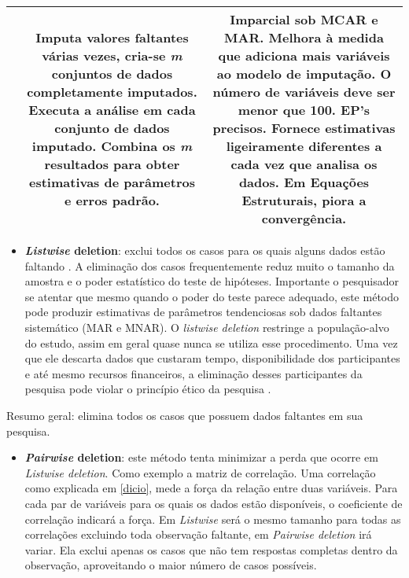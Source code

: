 \documentclass[
]{book}
\providecommand{\tightlist}{%
  \setlength{\itemsep}{0pt}\setlength{\parskip}{0pt}}
\begin{document}
\begin{longtable}[]{@{}ccc@{}}
\begin{minipage}[t]{0.30\columnwidth}
\end{minipage} & \begin{minipage}[t]{0.30\columnwidth}\centering
Imputa valores faltantes várias vezes, cria-se \emph{m} conjuntos de dados completamente imputados. Executa a análise em cada conjunto de dados imputado. Combina os \emph{m} resultados para obter estimativas de parâmetros e erros padrão.\strut
\end{minipage} & \begin{minipage}[t]{0.30\columnwidth}\centering
Imparcial sob MCAR e MAR. Melhora à medida que adiciona mais variáveis ao modelo de imputação. O número de variáveis deve ser menor que 100. EP's precisos. Fornece estimativas ligeiramente diferentes a cada vez que analisa os dados. Em Equações Estruturais, piora a convergência.\strut
\end{minipage}\tabularnewline
\bottomrule
\end{longtable}

\begin{itemize}
\tightlist
\item
  \textbf{\emph{Listwise} deletion}: exclui todos os casos para os quais alguns dados estão faltando . A eliminação dos casos frequentemente reduz muito o tamanho da amostra e o poder estatístico do teste de hipóteses. Importante o pesquisador se atentar que mesmo quando o poder do teste parece adequado, este método pode produzir estimativas de parâmetros tendenciosas sob dados faltantes sistemático (MAR e MNAR). O \emph{listwise deletion} restringe a população-alvo do estudo, assim em geral quase nunca se utiliza esse procedimento. Uma vez que ele descarta dados que custaram tempo, disponibilidade dos participantes e até mesmo recursos financeiros, a eliminação desses participantes da pesquisa pode violar o princípio ético da pesquisa \citep{rosenthal1994science}.
\end{itemize}

Resumo geral: elimina todos os casos que possuem dados faltantes em sua pesquisa.

\begin{itemize}
\tightlist
\item
  \textbf{\emph{Pairwise} deletion}: este método tenta minimizar a perda que ocorre em \emph{Listwise deletion}. Como exemplo a matriz de correlação. Uma correlação como explicada em \ref{dicio}, mede a força da relação entre duas variáveis. Para cada par de variáveis para os quais os dados estão disponíveis, o coeficiente de correlação indicará a força. Em \emph{Listwise} será o mesmo tamanho para todas as correlações excluindo toda observação faltante, em \emph{Pairwise deletion} irá variar. Ela exclui apenas os casos que não tem respostas completas dentro da observação, aproveitando o maior número de casos possíveis.
\end{itemize}
\end{document}
